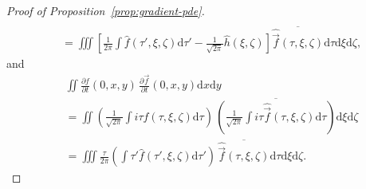 \documentclass{article}
\newcommand{\dif}{\mathrm{d}}
\begin{document}
\begin{proof}[Proof of Proposition~\ref{prop:gradient-pde}]
\begin{align*}
        \\ &= \iiint \left[ \frac{1}{2\pi} \int \widehat{f}(\tau', \xi, \zeta) \dif\tau' - \frac{1}{\sqrt{2\pi}} \widehat{h}(\xi, \zeta) \right] \overline{\widehat{\vec{f}}(\tau, \xi, \zeta)} \dif \tau \dif \xi \dif \zeta,
    \end{align*}
    and
    \begin{align*}
        & \iint \frac{\partial f}{\partial t}(0, x, y) \, \frac{\partial \vec{f}}{\partial t}(0, x, y) \dif x \dif y
        \\ &= \iint \left( \frac{1}{\sqrt{2\pi}} \int i \tau \widehat{f}(\tau, \xi, \zeta) \dif \tau \right) \, \overline{\left( \frac{1}{\sqrt{2\pi}} \int i \tau \widehat{\vec{f}}(\tau, \xi, \zeta) \dif \tau \right)} \dif \xi \dif \zeta
        \\ &= \iiint \frac{\tau}{2\pi} \left( \int \tau' \widehat{f}(\tau', \xi, \zeta) \dif \tau' \right) \, \overline{\widehat{\vec{f}}(\tau, \xi, \zeta)} \dif \tau \dif \xi \dif \zeta.
    \end{align*}


\end{proof}
\end{document}
